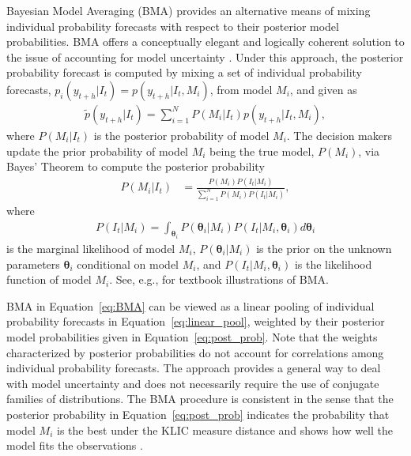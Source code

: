 \documentclass[11pt]{article}
\begin{document}
Bayesian Model Averaging (BMA) provides an alternative means of mixing individual probability forecasts with respect to their posterior model probabilities. BMA offers a conceptually elegant and logically coherent solution to the issue of accounting for model uncertainty \citep[see, e.g.,][]{Leamer1978-sp,Draper1995-cd,Raftery1997-ij,Garratt2003-kh}. Under this approach, the posterior probability forecast is computed by mixing a set of individual probability forecasts, $p_{i}(y_{t+h}|I_{t})=p(y_{t+h}|I_{t},M_{i})$, from model $M_{i}$, and given as
\begin{align}
\label{eq:BMA}
\tilde{p}(y_{t+h}|I_{t}) = \sum_{i=1}^{N} P(M_{i}|I_{t})p(y_{t+h}|I_{t},M_{i}),
\end{align}
where $P(M_{i}|I_{t})$ is the posterior probability of model $M_{i}$. The decision makers update the prior probability of model $M_{i}$ being the true model, $P(M_{i})$, via Bayes' Theorem to compute the posterior probability
\begin{align}
\label{eq:post_prob}
P(M_{i}|I_{t}) & = \frac{P(M_{i})P(I_{t}|M_{i})}{\sum_{i=1}^{N} P(M_{i})P(I_{t}|M_{i})},
\end{align}
where
\begin{align}
\label{eq:marginal_likelihood}
P(I_{t}|M_{i}) = \int_{\boldsymbol{\theta}_{i}} P\left(\boldsymbol{\theta}_{i} | M_{i}\right) P\left(I_{t} | M_{i}, \boldsymbol{\theta}_{i}\right) d \boldsymbol{\theta}_{i}
\end{align}
is the marginal likelihood of model $M_{i}$, $P\left(\boldsymbol{\theta}_{i} | M_{i}\right)$ is the prior on the unknown parameters $\boldsymbol{\theta}_{i}$ conditional on model $M_{i}$, and $P\left(I_{t} | M_{i}, \boldsymbol{\theta}_{i}\right)$ is the likelihood function of model $M_{i}$. See, e.g., \cite{Koop-2003bayesian} for textbook illustrations of BMA.

BMA in Equation~\eqref{eq:BMA} can be viewed as a linear pooling of individual probability forecasts in Equation~\eqref{eq:linear_pool}, weighted by their posterior model probabilities given in Equation~\eqref{eq:post_prob}. Note that the weights characterized by posterior probabilities do not account for correlations among individual probability forecasts. The approach provides a general way to deal with model uncertainty and does not necessarily require the use of conjugate families of distributions. The BMA procedure is consistent in the sense that the posterior probability in Equation~\eqref{eq:post_prob} indicates the probability that model $M_{i}$ is the best under the KLIC measure distance and shows how well the model fits the observations \citep{Fernandez-Villaverde2004-pz,Raftery2005-vu,Wright2008-bs}.
\end{document}
